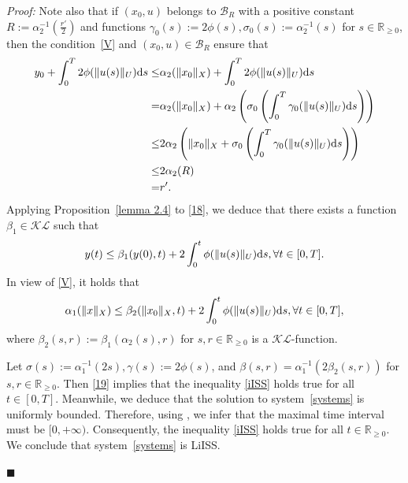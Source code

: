 \documentclass[onecolumn]{autart}
\newenvironment{proof}{{\it Proof:\enspace}}{\hfill $\blacksquare$\par}
\newenvironment{proof of Prop.ODE}{{\it Proof of Proposition~\ref{Prop.ODE}:\enspace}}{\hfill $\blacksquare$\par}
\newenvironment{proof of PDE}{{\it Proof of Proposition \ref{Prop.8}:\enspace}}{\hfill $\blacksquare$\par}
\begin{document}
{\begin{proof}
	Note also that if $(x_{0},u) $ belongs to $  \mathscr{B}_{R}$ with a positive constant {$R:=\alpha_2^{-1}\left(\frac{r'}{2}\right)$} and functions $\gamma_0(s):=2\phi(s), {\sigma_{0}(s):= \alpha_2^{-1}(s)}$ for $s\in \mathbb{R}_{\geq 0}$, then the condition~\eqref{V} and $(x_{0},u)\in \mathscr{B}_{R}$ ensure  that
	\begin{align*}
		y_0+  \int^{T}_{0}2{\phi}(\|u(s)\|_{ U}){\rm d}s\leq&  \alpha_2(\|x_0\|_X )+\int^{T}_{0}2{\phi}(\|u(s)\|_{ U}){\rm d}s\notag\\
		=&\alpha_2(\|x_0\|_X )+\alpha_2\left(\sigma_{0}\left(\int^{T}_{0}\gamma_0(\|u(s)\|_{ U}){\rm d}s\right)\right)\notag\\
		\leq &2\alpha_2\left(\|x_0\|_X +\sigma_{0}\left(\int^{T}_{0}\gamma_0(\|u(s)\|_{ U}){\rm d}s\right)\right)\notag\\
		\leq & 2\alpha_2( R ) \notag\\
		=&r'.%
	\end{align*}
	Applying {Proposition}~\ref{lemma 2.4} to \eqref{18}, we deduce that
	there exists a function $\beta_{1}\in\mathcal{K}\mathcal{L}$   such  that
	\begin{align*}
		y(t)\leq\beta_{1}(y(0), t)+2\int^{t}_{0}{\phi}(\|u(s)\|_{ U}){\rm d}s,\forall t\in[0,T].
	\end{align*}
	In view of \eqref{V}, it holds that
	\begin{align}\label{19}
		\alpha_{1}(\|x\|_{ X })\leq \beta_{2}(\|x_{0}\|_{ X }, t)+2\int^{t}_{0}{\phi}(\|u(s)\|_{ U}){\rm d}s,\forall t\in[0,T],
	\end{align}
	where $\beta_{2}(s,r):=\beta_{1}({\alpha_{2}}(s),  r)$ for $ s,r \in   \mathbb{R}_{\geq 0} $ is  a $ \mathcal{K}\mathcal{L}$-function.
	
	Let $\sigma(s) := \alpha_{1}^{-1}(2s),  {\gamma}(s) := 2{\phi}(s)$, and $\beta(s, r) =\alpha_{1}^{-1}(2\beta_{2}(s, r))$ for $ s,r \in  \mathbb{R}_{\geq 0} $. Then  \eqref{19} implies that the inequality \eqref{iISS} holds true for all $t\in[0,T]$.   Meanwhile, we deduce that the solution {to} system~\eqref{systems} is uniformly bounded. Therefore, using \cite[Theorem 1.4]{Pazy2012semigroups}, we infer that the   maximal time interval must be $[0,+\infty)$.
	Consequently,   the inequality \eqref{iISS} holds true for all $t\in\mathbb{R}_{\geq0}$. We conclude that system~\eqref{systems} is LiISS.
	

\end{proof}}
\end{document}
